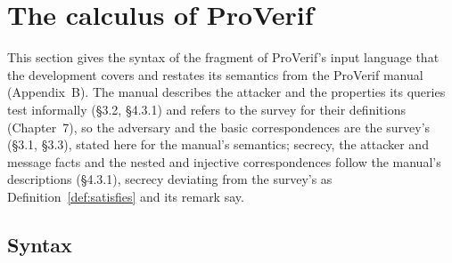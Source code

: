 \documentclass[11pt]{article}
\theoremstyle{definition}
\theoremstyle{plain}
\theoremstyle{remark}
\begin{document}
\section{The calculus of ProVerif}\label{sec:calculus}

This section gives the syntax of the fragment of ProVerif's input language that the development covers and restates its semantics from the ProVerif manual (Appendix~B). The manual describes the attacker and the properties its queries test informally (\S3.2, \S4.3.1) and refers to the survey for their definitions (Chapter~7), so the adversary and the basic correspondences are the survey's (\S3.1, \S3.3), stated here for the manual's semantics; secrecy, the attacker and message facts and the nested and injective correspondences follow the manual's descriptions (\S4.3.1), secrecy deviating from the survey's as Definition~\ref{def:satisfies} and its remark say.

\subsection{Syntax}
\end{document}
